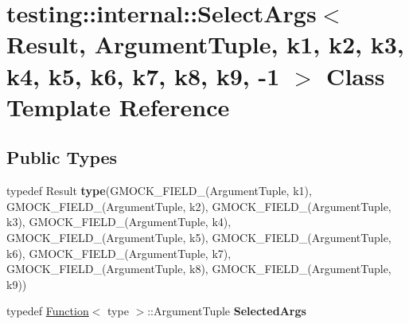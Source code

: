 \hypertarget{classtesting_1_1internal_1_1SelectArgs_3_01Result_00_01ArgumentTuple_00_01k1_00_01k2_00_01k3_00_a44b2a3fb6bab261818c61ba2b7f389a}{}\section{testing\+:\+:internal\+:\+:Select\+Args$<$ Result, Argument\+Tuple, k1, k2, k3, k4, k5, k6, k7, k8, k9, -\/1 $>$ Class Template Reference}
\label{classtesting_1_1internal_1_1SelectArgs_3_01Result_00_01ArgumentTuple_00_01k1_00_01k2_00_01k3_00_a44b2a3fb6bab261818c61ba2b7f389a}
\subsection*{Public Types}
\begin{DoxyCompactItemize}
\item 
\mbox{\label{classtesting_1_1internal_1_1SelectArgs_3_01Result_00_01ArgumentTuple_00_01k1_00_01k2_00_01k3_00_a44b2a3fb6bab261818c61ba2b7f389a_a854bb83e6677b7a1d6ad4c1ffe81bf63}} 
typedef Result {\bfseries type}(G\+M\+O\+C\+K\+\_\+\+F\+I\+E\+L\+D\+\_\+(Argument\+Tuple, k1), G\+M\+O\+C\+K\+\_\+\+F\+I\+E\+L\+D\+\_\+(Argument\+Tuple, k2), G\+M\+O\+C\+K\+\_\+\+F\+I\+E\+L\+D\+\_\+(Argument\+Tuple, k3), G\+M\+O\+C\+K\+\_\+\+F\+I\+E\+L\+D\+\_\+(Argument\+Tuple, k4), G\+M\+O\+C\+K\+\_\+\+F\+I\+E\+L\+D\+\_\+(Argument\+Tuple, k5), G\+M\+O\+C\+K\+\_\+\+F\+I\+E\+L\+D\+\_\+(Argument\+Tuple, k6), G\+M\+O\+C\+K\+\_\+\+F\+I\+E\+L\+D\+\_\+(Argument\+Tuple, k7), G\+M\+O\+C\+K\+\_\+\+F\+I\+E\+L\+D\+\_\+(Argument\+Tuple, k8), G\+M\+O\+C\+K\+\_\+\+F\+I\+E\+L\+D\+\_\+(Argument\+Tuple, k9))
\item 
\mbox{\label{classtesting_1_1internal_1_1SelectArgs_3_01Result_00_01ArgumentTuple_00_01k1_00_01k2_00_01k3_00_a44b2a3fb6bab261818c61ba2b7f389a_a6f5cac5d2d8eb14d972efd6247c296c8}} 
typedef \hyperlink{structtesting_1_1internal_1_1Function}{Function}$<$ type $>$\+::Argument\+Tuple {\bfseries Selected\+Args}
\end{DoxyCompactItemize}
